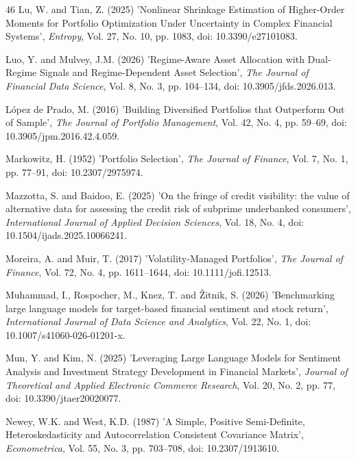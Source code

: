\documentclass{singlecol-new}
\theoremstyle{TH}{
\newtheorem{lemma}{Lemma}
\newtheorem{theorem}[lemma]{Theorem}
\newtheorem{corrolary}[lemma]{Corrolary}
\newtheorem{conjecture}[lemma]{Conjecture}
\newtheorem{proposition}[lemma]{Proposition}
\newtheorem{claim}[lemma]{Claim}
\newtheorem{stheorem}[lemma]{Wrong Theorem}
\newtheorem{algorithm}{Algorithm}
}
\theoremstyle{THrm}{
\newtheorem{definition}{Definition}[section]
\newtheorem{question}{Question}[section]
\newtheorem{remark}{Remark}
\newtheorem{scheme}{Scheme}
}
\theoremstyle{THhit}{
\newtheorem{case}{Case}[section]
}
\begin{document}
\begin{thebibliography}{46}
Lu, W. and Tian, Z. (2025) 'Nonlinear Shrinkage Estimation of Higher-Order Moments for Portfolio Optimization Under Uncertainty in Complex Financial Systems', {\it Entropy}, Vol. 27, No. 10, pp. 1083, doi: 10.3390/e27101083.

Luo, Y. and Mulvey, J.M. (2026) 'Regime-Aware Asset Allocation with Dual-Regime Signals and Regime-Dependent Asset Selection', {\it The Journal of Financial Data Science}, Vol. 8, No. 3, pp. 104--134, doi: 10.3905/jfds.2026.013.

López de Prado, M. (2016) 'Building Diversified Portfolios that Outperform Out of Sample', {\it The Journal of Portfolio Management}, Vol. 42, No. 4, pp. 59--69, doi: 10.3905/jpm.2016.42.4.059.

Markowitz, H. (1952) 'Portfolio Selection', {\it The Journal of Finance}, Vol. 7, No. 1, pp. 77--91, doi: 10.2307/2975974.

Mazzotta, S. and Baidoo, E. (2025) 'On the fringe of credit visibility: the value of alternative data for assessing the credit risk of subprime underbanked consumers', {\it International Journal of Applied Decision Sciences}, Vol. 18, No. 4, doi: 10.1504/ijads.2025.10066241.

Moreira, A. and Muir, T. (2017) 'Volatility‐Managed Portfolios', {\it The Journal of Finance}, Vol. 72, No. 4, pp. 1611--1644, doi: 10.1111/jofi.12513.

Muhammad, I., Rospocher, M., Knez, T. and Žitnik, S. (2026) 'Benchmarking large language models for target-based financial sentiment and stock return', {\it International Journal of Data Science and Analytics}, Vol. 22, No. 1, doi: 10.1007/s41060-026-01201-x.

Mun, Y. and Kim, N. (2025) 'Leveraging Large Language Models for Sentiment Analysis and Investment Strategy Development in Financial Markets', {\it Journal of Theoretical and Applied Electronic Commerce Research}, Vol. 20, No. 2, pp. 77, doi: 10.3390/jtaer20020077.

Newey, W.K. and West, K.D. (1987) 'A Simple, Positive Semi-Definite, Heteroskedasticity and Autocorrelation Consistent Covariance Matrix', {\it Econometrica}, Vol. 55, No. 3, pp. 703--708, doi: 10.2307/1913610.


\end{thebibliography}
\end{document}
